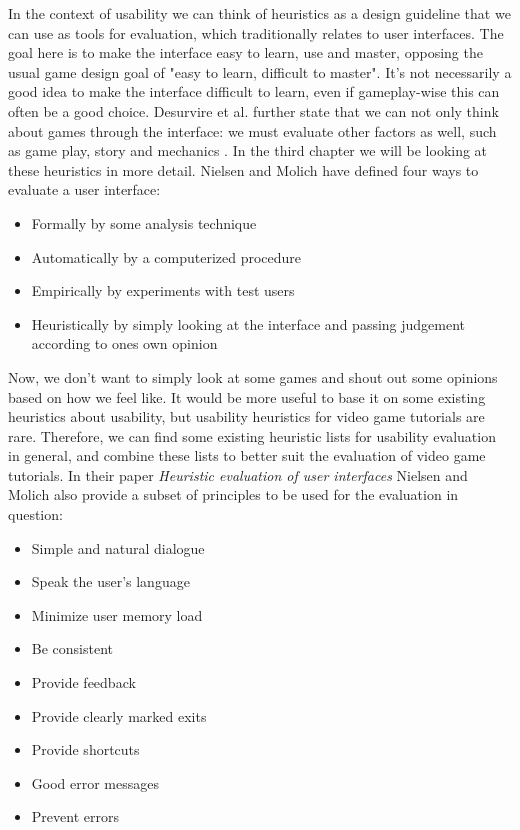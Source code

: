 In the context of usability we can think of heuristics as a design guideline that we can use as tools for evaluation, which traditionally relates to user interfaces. The goal here is to make the interface easy to learn, use and master, opposing the usual game design goal of "easy to learn, difficult to master". \cite{Desurvire2004} It's not necessarily a good idea to make the interface difficult to learn, even if gameplay-wise this can often be a good choice. Desurvire et al. further state that we can not only think about games through the interface: we must evaluate other factors as well, such as game play, story and mechanics \cite{Desurvire2004}. In the third chapter we will be looking at these heuristics in more detail. Nielsen and Molich \cite{Nielsen1990} have defined four ways to evaluate a user interface: 

\begin{itemize}
\item Formally by some analysis technique
\item Automatically by a computerized procedure
\item Empirically by experiments with test users 
\item Heuristically by simply looking at the interface and passing judgement according to ones own opinion
\end{itemize}

Now, we don't want to simply look at some games and shout out some opinions based on how we feel like. It would be more useful to base it on some existing heuristics about usability, but usability heuristics for video game tutorials are rare. Therefore, we can find some existing heuristic lists for usability evaluation in general, and combine these lists to better suit the evaluation of video game tutorials. In their paper \textit{Heuristic evaluation of user interfaces} Nielsen and Molich also provide a subset of principles to be used for the evaluation in question: \cite{Nielsen1990}

\begin{itemize}
	\item Simple and natural dialogue
	\item Speak the user's language
	\item Minimize user memory load
	\item Be consistent
	\item Provide feedback
	\item Provide clearly marked exits
	\item Provide shortcuts
	\item Good error messages
	\item Prevent errors
\end{itemize}

